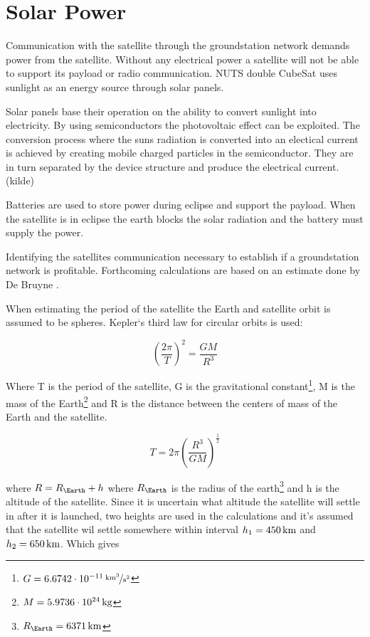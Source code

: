 \section{Solar Power}

Communication with the satellite through the groundstation network demands power from the satellite. Without any electrical power a satellite will not be able to support its payload or radio communication. NUTS double CubeSat uses sunlight as an energy source through solar panels. 

Solar panels base their operation on the ability to convert sunlight into electricity. By using semiconductors the photovoltaic effect can be exploited. The conversion process where the suns radiation is converted into an electical current is achieved by creating mobile charged particles in the semiconductor. They are in turn separated by the device structure and produce the electrical current.(kilde) 

Batteries are used to store power during eclipse and support the payload. When the satellite is in eclipse the earth blocks the solar radiation and the battery must supply the power.

Identifying the satellites communication necessary to establish if a groundstation network is profitable. Forthcoming calculations are based on an estimate done by De Bruyne \cite{Satellite Power Systems}.

When estimating the period of the satellite the Earth and satellite orbit is assumed to be spheres. Kepler`s third law for circular orbits is used:

\begin{equation}
\left(\frac{2\pi}{T}\right)^2 = \frac{GM}{R^3}
\label{eq:Keplers_3}
\end{equation}

Where T is the period of the satellite, G is the gravitational constant\footnote{$G=\unitfrac[6.6742\cdot 10^{-11}]{km^3}{s^2}$}, M is the mass of the Earth\footnote{$M=\unit[5.9736\cdot 10^{24}]{kg}$} and R is the distance between the centers of mass of the Earth and the satellite.

\begin{equation}
T = 2\pi \left(\frac{R^3}{GM}\right)^{\frac{1}{2}}
\label{eq:satellite_period}
\end{equation}

where $R = R_\Earth + h$ where $R_\Earth$ is the radius of the earth\footnote{$R_\Earth = \unit[6371]{km}$} and h is the altitude of the satellite. 
Since it is uncertain what altitude the satellite will settle in after it is launched, two heights are used in the calculations and it's assumed that the satellite wil settle somewhere within interval $h_1=\unit[450]{km}$ and $h_2=\unit[650]{km}$. 
Which gives

